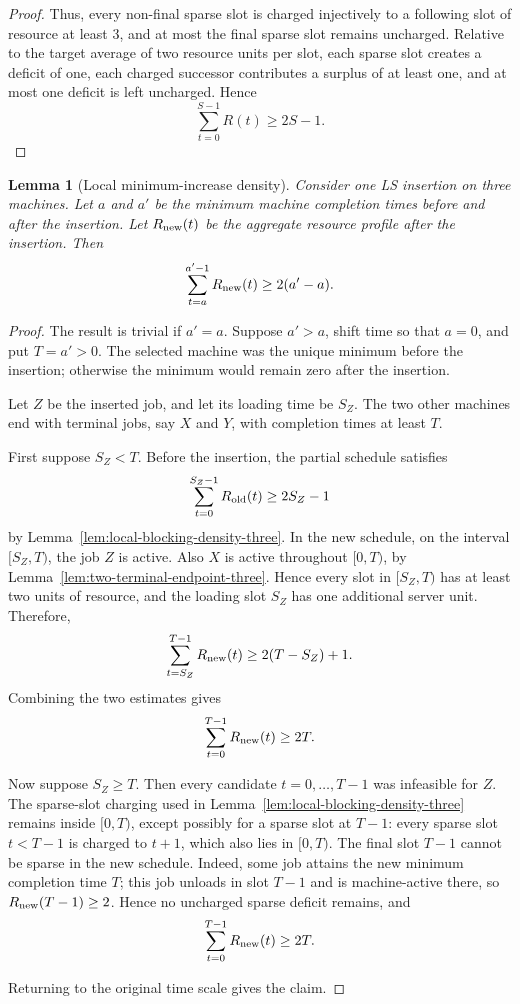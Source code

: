\documentclass[11pt]{article}
\newtheorem{lemma}[theorem]{Lemma}
\begin{document}
\begin{proof}
Thus, every non-final sparse slot is charged injectively to a following slot of
resource at least \(3\), and at most the final sparse slot remains uncharged.
Relative to the target average of two resource units per slot, each sparse
slot creates a deficit of one, each charged successor contributes a surplus of
at least one, and at most one deficit is left uncharged. Hence
\[
        \sum_{t=0}^{S-1}R(t)\ge2S-1 .
\]
\end{proof}

\begin{lemma}[Local minimum-increase density]
\label{lem:local-minimum-increase-density-three}
Consider one LS insertion on three machines. Let \(a\) and \(a'\) be the minimum
machine completion times before and after the insertion. Let \(R_{\rm new}(t)\)
be the aggregate resource profile after the insertion. Then
\[
        \sum_{t=a}^{a'-1}R_{\rm new}(t)\ge2(a'-a).
\]
\end{lemma}

\begin{proof}
The result is trivial if \(a'=a\). Suppose \(a'>a\), shift time so that \(a=0\),
and put \(T=a'>0\). The selected machine was the unique minimum before the
insertion; otherwise the minimum would remain zero after the insertion.

Let \(Z\) be the inserted job, and let its loading time be \(S_Z\). The two
other machines end with terminal jobs, say \(X\) and \(Y\), with completion
times at least \(T\).

First suppose \(S_Z<T\). Before the insertion, the partial schedule satisfies
\[
        \sum_{t=0}^{S_Z-1}R_{\rm old}(t)\ge2S_Z-1
\]
by Lemma~\ref{lem:local-blocking-density-three}. In the new schedule, on the
interval \([S_Z,T)\), the job \(Z\) is active. Also \(X\) is active throughout
\([0,T)\), by Lemma~\ref{lem:two-terminal-endpoint-three}. Hence every slot in
\([S_Z,T)\) has at least two units of resource, and the loading slot \(S_Z\) has
one additional server unit. Therefore, 
\[
        \sum_{t=S_Z}^{T-1}R_{\rm new}(t)\ge 2(T-S_Z)+1 .
\]
Combining the two estimates gives
\[
        \sum_{t=0}^{T-1}R_{\rm new}(t)\ge 2T .
\]

Now suppose \(S_Z\ge T\). Then every candidate \(t=0,\ldots,T-1\) was infeasible
for \(Z\). The sparse-slot charging used in
Lemma~\ref{lem:local-blocking-density-three} remains inside \([0,T)\), except
possibly for a sparse slot at \(T-1\): every sparse slot \(t<T-1\) is charged to
\(t+1\), which also lies in \([0,T)\). The final slot \(T-1\) cannot be sparse
in the new schedule. Indeed, some job attains the new minimum completion time
\(T\); this job unloads in slot \(T-1\) and is machine-active there, so
\(R_{\rm new}(T-1)\ge2\). Hence no uncharged sparse deficit remains, and
\[
        \sum_{t=0}^{T-1}R_{\rm new}(t)\ge2T .
\]

Returning to the original time scale gives the claim.
\end{proof}
\end{document}
